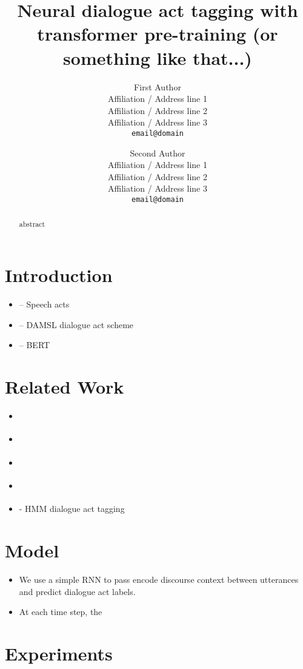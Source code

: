 \documentclass[11pt,a4paper]{article}
\title{Neural dialogue act tagging with transformer pre-training (or something like that...)}
\author{
  First Author \\
  Affiliation / Address line 1 \\
  Affiliation / Address line 2 \\
Affiliation / Address line 3 \\
  {\tt email@domain} \\\and
  Second Author \\
  Affiliation / Address line 1 \\
  Affiliation / Address line 2 \\
  Affiliation / Address line 3 \\
  {\tt email@domain} \\
}
\date{}
\begin{document}
\maketitle

\begin{abstract}
  abstract
\end{abstract}

\section{Introduction}
\begin{itemize}
  \item \cite{austinHowThingsWords2009} -- Speech acts
  \item \cite{coreCodingDialogsDAMSL1997} -- DAMSL dialogue act scheme
  \item \cite{devlinBERTPretrainingDeep2018} -- BERT
\end{itemize}

\section{Related Work}
\begin{itemize}
  \item \cite{cerisaraEffectsUsingWord2vec2017}
  \item \cite{kalchbrennerRecurrentConvolutionalNeural2013}
  \item \cite{pragstVectorRepresentationUtterances2018}
  \item \cite{sordoniNeuralNetworkApproach2015}
  \item \cite{stolckeDialogueActModeling2000} - HMM dialogue act tagging
\end{itemize}

\section{Model}
\begin{itemize}
  \item We use a simple RNN to pass encode discourse context between utterances and predict dialogue act labels.
  \item At each time step, the 
\end{itemize}

\section{Experiments}

{}

\end{document}
